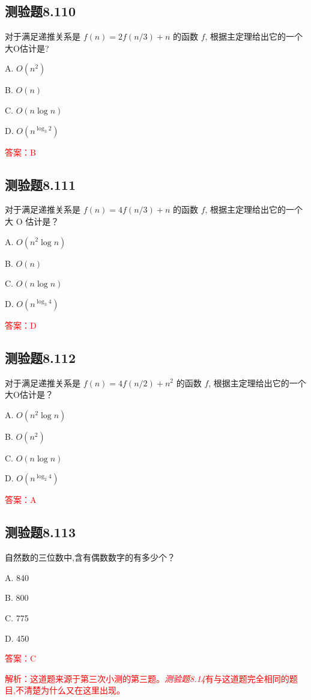 \documentclass[UTF8, heading=true]{ctexart}
\begin{document}
\subsection{测验题8.110}

对于满足递推关系是 $f(n)=2 f(n / 3)+n$ 的函数 $f$, 根据主定理给出它的一个大O估计是?

A. $O\left(n^2\right)$

B. $O(n)$

C. $O(n \log n)$

D. $O\left(n^{\log _3 2}\right)$

\textcolor{red}{答案：B}

\subsection{测验题8.111}

对于满足递推关系是 $f(n)=4 f(n / 3)+n$ 的函数 $f$, 根据主定理给出它的一个大 O 估计是？

A. $O\left(n^2 \log n\right)$

B. $O(n)$

C. $O(n \log n)$

D. $O\left(n^{\log _3 4}\right)$

\textcolor{red}{答案：D}

\subsection{测验题8.112}

对于满足递推关系是 $f(n)=4 f(n / 2)+n^2$ 的函数 $f$, 根据主定理给出它的一个大O估计是？

A. $O\left(n^2 \log n\right)$

B. $O\left(n^2\right)$

C. $O(n \log n)$

D. $O\left(n^{\log _2 4}\right)$

\textcolor{red}{答案：A}

\subsection{测验题8.113}

自然数的三位数中,含有偶数数字的有多少个？

A. 840

B. 800

C. 775

D. 450

\textcolor{red}{答案：C}

\textcolor{red}{解析：这道题来源于第三次小测的第三题。\textit{测验题8.14}有与这道题完全相同的题目,不清楚为什么又在这里出现。}
\end{document}

